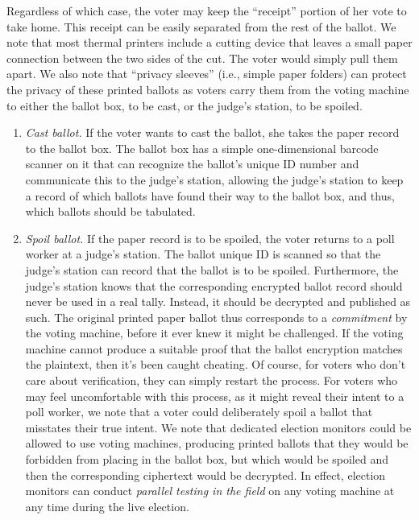 \begin{enumerate}
Regardless of which case, the voter may keep the ``receipt'' portion of her vote to take home. This receipt can be easily separated from the rest of the ballot. We note that most thermal printers include a cutting device that leaves a small paper connection between the two sides of the cut. The voter would simply pull them apart. We also note that ``privacy sleeves'' (i.e., simple paper folders) can protect the privacy of these printed ballots as voters carry them from the voting machine to either the ballot box, to be cast, or the judge's station, to be spoiled.

\begin{enumerate}
\item  {\em Cast ballot.}
If the voter wants to cast the ballot, she takes the paper record to the ballot box.
The ballot box has a simple one-dimensional barcode scanner on it that can recognize the ballot's unique ID number
and communicate this to the judge's station, allowing the judge's station to keep a record of which ballots have found their way to the ballot box, and thus, which ballots should be tabulated. 

\item {\em Spoil ballot.}
If the paper record is to be spoiled, the voter returns to a poll worker at a judge's station. 
The ballot unique ID is scanned so that the judge's station can record that the ballot is to be spoiled. Furthermore, the judge's station knows that the corresponding encrypted ballot record should never be used in a real tally. Instead, it should be decrypted and published as such. The original printed paper ballot thus corresponds to a {\em commitment} by the voting machine, before it ever knew it might be challenged. If the voting machine cannot produce a suitable proof that the ballot encryption matches the plaintext, then it's been caught cheating. Of course, for voters who don't care about verification, they can simply restart the process. For voters who may feel uncomfortable with this process, as it might reveal their intent to a poll worker, we note that a voter could deliberately spoil a ballot that misstates their true intent. We note that dedicated election monitors could be allowed to use voting machines, producing printed ballots that they would be forbidden from placing in the ballot box, but which would be spoiled and then the corresponding ciphertext would be decrypted. In effect, election monitors can conduct {\em parallel testing in the field} on any voting machine at any time during the live election.



\end{enumerate}
\end{enumerate}
